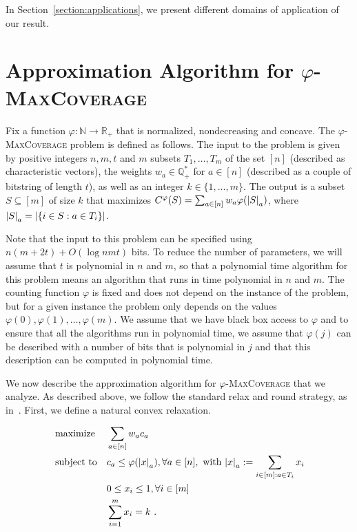In Section~\ref{section:applications}, we present different domains of application of our result.

\section{Approximation Algorithm for $\varphi$-\textsc{MaxCoverage}}
\label{section:ApproxAlgo}

Fix a function $\varphi : \mathbb{N} \to \mathbb{R}_+$ that is normalized, nondecreasing and concave. The $\varphi$-\textsc{MaxCoverage} problem is defined as follows. The input to the problem is given by positive integers $n,m,t$ and $m$ subsets $T_{1}, \dots, T_{m}$ of the set $[n]$ (described as characteristic vectors), the weights $w_a \in \mathbb{Q}_+^*$ for $a \in [n]$ (described as a couple of bitstring of length $t$), as well as an integer $k \in \{1, \dots, m\}$.  The output is a subset $S \subseteq [m]$ of size $k$ that maximizes $C^{\varphi}(S) = \sum_{a \in [n]} w_a \varphi(\abs{S}_a)$, where $\abs{S}_a = \abs{\{ i \in S : a \in T_i\}}$.

Note that the input to this problem can be specified using $n(m+2t) + O(\log nmt)$ bits. To reduce the number of parameters, we will assume that $t$ is polynomial in $n$ and $m$, so that a polynomial time algorithm for this problem means an algorithm that runs in time polynomial in $n$ and $m$. The counting function $\varphi$ is fixed and does not depend on the instance of the problem, but for a given instance the problem only depends on the values $\varphi(0), \varphi(1), \dots, \varphi(m)$. We assume that we have black box access to $\varphi$ and to ensure that all the algorithms run in polynomial time, we assume that $\varphi(j)$ can be described with a number of bits that is polynomial in $j$ and that this description can be computed in polynomial time.

We now describe the approximation algorithm for $\varphi$-\textsc{MaxCoverage} that we analyze. As described above, we follow the standard relax and round strategy, as in~\cite{BFGG20}. First, we define a natural convex relaxation.
\begin{definition}
  \begin{equation}
    \begin{aligned}
      &\operatorname{\text{maximize}}&& \sum_{a \in [n]} w_ac_a \\
      &\operatorname{\text{subject to}}&& c_a \leq \varphi(\abs{x}_a), \forall a \in [n],\text{ with }\abs{x}_a := \sum_{i \in [m] : a \in T_i} x_i\\
      &&& 0 \leq x_i \leq 1, \forall i \in [m]\\
      &&& \sum_{i=1}^m x_i = k \ .
    \end{aligned}
  \end{equation}
  \label{defi:relaxedProg}
\end{definition}

